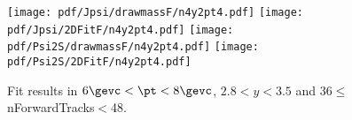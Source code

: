 \begin{figure}[H]
\begin{center}
\texttt{[image: pdf/Jpsi/drawmassF/n4y2pt4.pdf]}
\texttt{[image: pdf/Jpsi/2DFitF/n4y2pt4.pdf]}
\vspace*{-0.5cm}
\texttt{[image: pdf/Psi2S/drawmassF/n4y2pt4.pdf]}
\texttt{[image: pdf/Psi2S/2DFitF/n4y2pt4.pdf]}
\vspace*{-0.5cm}
\end{center}
\caption{Fit results in $6\gevc<\pt<8\gevc$, $2.8<y<3.5$ and 36$\leq$nForwardTracks$<$48.}
\label{Fitn4y2pt4}
\end{figure}
